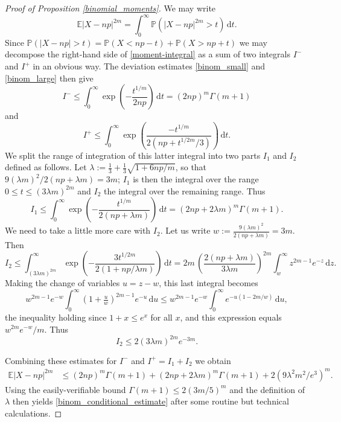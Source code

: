 \documentclass[12pt,a4paper,reqno]{amsart}
\numberwithin{equation}{section}
\theoremstyle{plain}
\theoremstyle{definition}
\renewcommand{\leq}{\leqslant}
\def\E{\mathbb{E}}
\def\P{\mathbb{P}}
\newcommand{\ud}{\,\mathrm{d}}
\begin{document}
\begin{proof}[Proof of Proposition \ref{binomial_moments}]
We may write 
\begin{equation}
\E |X - np|^{2m} = \int_0^{\infty} \P( |X - np|^{2m} > t ) \ud t. \label{moment-integral}
\end{equation}
Since $\P( |X - np| > t ) = \P( X < np - t ) + \P( X > np + t )$ we may decompose the right-hand side of \eqref{moment-integral} as a sum of two integrals $I^-$ and $I^+$ in an obvious way. The deviation estimates \eqref{binom_small} and \eqref{binom_large} then give
\[ I^- \leq \int_0^{\infty} \exp\left(-\frac{t^{1/m}}{2np}\right) \ud t = (2np)^m \Gamma(m+1) \]
and
\[ I^+ \leq \int_0^{\infty} \exp\left( \frac{-t^{1/m}}{2(np + t^{1/2m}/3)} \right) \ud t. \]
We split the range of integration of this latter integral into two parts $I_1$ and $I_2$ defined as follows. Let $\lambda := \frac{1}{3} + \frac{1}{3}\sqrt{1+6np/m}$, so that $9(\lambda m)^2/2(np + \lambda m)=3m$; $I_1$ is then the integral over the range $0 \leq t \leq (3\lambda m)^{2m}$ and $I_2$ the integral over the remaining range. Thus
\[ I_1 \leq \int_0^{\infty} \exp\left( -\frac{t^{1/m}}{2(np+\lambda m)}\right) \ud t = \left(2np + 2\lambda m\right)^m \Gamma(m+1). \]
We need to take a little more care with $I_2$. Let us write $w := \frac{9(\lambda m)^2}{2(np + \lambda m)} = 3m$. Then
\[ I_2 \leq \int_{(3\lambda m)^{2m}}^{\infty} \exp\left(- \frac{3t^{1/2m}}{2(1+np/\lambda m)}\right) \ud t = 2m\, \left(\frac{2(np+\lambda m)}{3\lambda m}\right)^{2m} \int_w^{\infty} z^{2m-1} e^{-z} \ud z. \]
Making the change of variables $u = z - w$, this last integral becomes
\[ w^{2m-1} e^{-w} \int_0^{\infty} \left(1+\tfrac{u}{w}\right)^{2m-1} e^{-u} \ud u \leq w^{2m-1} e^{-w} \int_0^{\infty} e^{-u(1-2m/w)} \ud u, \]
the inequality holding since $1+x \leq e^x$ for all $x$, and this expression equals $w^{2m} e^{-w}/m$. Thus
\[ I_2 \leq 2(3\lambda m)^{2m} e^{-3m}. \]

Combining these estimates for $I^-$ and $I^+ = I_1 + I_2$ we obtain 
\begin{align*}
\E |X - np|^{2m} &\leq (2np)^m \Gamma(m+1) + (2np+2\lambda m)^m \Gamma(m+1) + 2(9\lambda^2 m^2/e^3)^m.
\end{align*}
Using the easily-verifiable bound $\Gamma(m+1) \leq 2(3m/5)^m$ and the definition of $\lambda$ then yields \eqref{binom_conditional_estimate} after some routine but technical calculations.
\end{proof}
\end{document}

